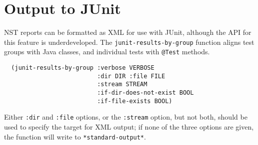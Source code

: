 
\section{Output to JUnit}
\label{sec:junit}
NST reports can be formatted as XML for use with JUnit, although the
API for this feature is underdeveloped.  The
\texttt{junit-results-by-group} function aligns test groups with Java
classes, and individual tests with \texttt{@Test} methods.
\begin{verbatim}
  (junit-results-by-group :verbose VERBOSE
                          :dir DIR :file FILE
                          :stream STREAM
                          :if-dir-does-not-exist BOOL
                          :if-file-exists BOOL)
\end{verbatim}
Either \texttt{:dir} and \texttt{:file} options, or the
\texttt{:stream} option, but not both, should be used to specify the
target for XML output; if none of the three options are given, the
function will write to \texttt{*standard-output*}.

